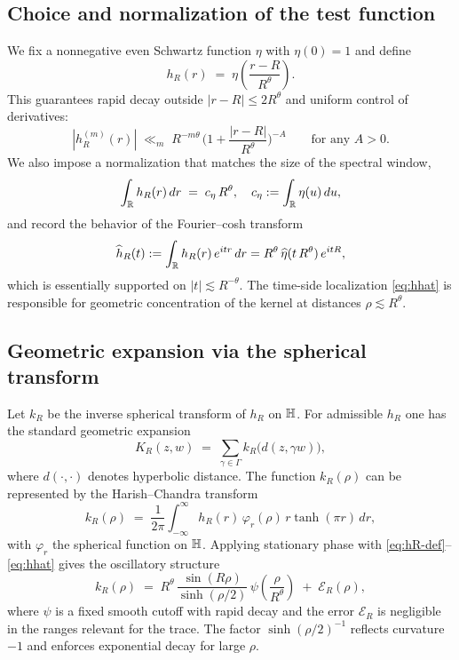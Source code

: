 \subsection{Choice and normalization of the test function}\label{subsec:testfunction}
We fix a nonnegative even Schwartz function $\eta$ with $\eta(0)=1$ and define
\begin{equation}\label{eq:hR-def}
h_R(r) \;=\; \eta\!\left(\frac{r-R}{R^\theta}\right).
\end{equation}
This guarantees rapid decay outside $|r-R|\le 2 R^\theta$ and uniform control of derivatives:
\[
|h_R^{(m)}(r)|
\;\ll_m\; R^{-m\theta}\,\Big(1+\frac{|r-R|}{R^\theta}\Big)^{-A}
\qquad\text{for any }A>0.
\]
We also impose a normalization that matches the size of the spectral window,
\begin{equation}\label{eq:normalization}
\int_{\mathbb{R}} h_R(r)\,dr \;=\; c_\eta\,R^\theta,
\quad c_\eta := \int_{\mathbb{R}}\eta(u)\,du,
\end{equation}
and record the behavior of the Fourier--cosh transform
\begin{equation}\label{eq:hhat}
\widehat{h}_R(t) := \int_{\mathbb{R}} h_R(r)\, e^{i t r}\,dr
= R^\theta\,\widehat{\eta}(t\,R^\theta)\,e^{i t R},
\end{equation}
which is essentially supported on $|t|\lesssim R^{-\theta}$. The time-side localization \eqref{eq:hhat} is responsible for geometric concentration of the kernel at distances $\rho\lesssim R^\theta$.

\subsection{Geometric expansion via the spherical transform}\label{subsec:geometric-kernel}
Let $k_R$ be the inverse spherical transform of $h_R$ on $\mathbb{H}$. For admissible $h_R$ one has the standard geometric expansion
\begin{equation}\label{eq:geom-sum}
K_R(z,w) \;=\; \sum_{\gamma\in\Gamma} k_R\!\big(d(z,\gamma w)\big),
\end{equation}
where $d(\cdot,\cdot)$ denotes hyperbolic distance. The function $k_R(\rho)$ can be represented by the Harish--Chandra transform
\[
k_R(\rho) \;=\; \frac{1}{2\pi}\int_{-\infty}^{\infty} h_R(r)\,\varphi_r(\rho)\, r \tanh(\pi r)\, dr,
\]
with $\varphi_r$ the spherical function on $\mathbb{H}$. Applying stationary phase with \eqref{eq:hR-def}--\eqref{eq:hhat} gives the oscillatory structure
\begin{equation}\label{eq:kR-asymp}
k_R(\rho) \;=\; R^\theta\, \frac{\sin(R\rho)}{\sinh(\rho/2)} \,\psi\!\left(\frac{\rho}{R^\theta}\right) \;+\; \mathcal{E}_R(\rho),
\end{equation}
where $\psi$ is a fixed smooth cutoff with rapid decay and the error $\mathcal{E}_R$ is negligible in the ranges relevant for the trace. The factor $\sinh(\rho/2)^{-1}$ reflects curvature $-1$ and enforces exponential decay for large $\rho$.

